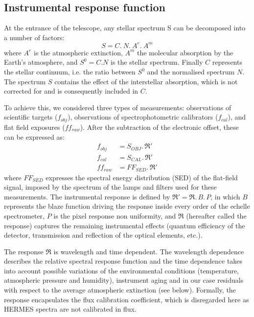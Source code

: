 \subsection{Instrumental response function}
At the entrance of the telescope, any stellar spectrum S can be decomposed into a number of factors:
\begin{equation}
    S = C .\ N .\ A^e .\ A^m
\end{equation}
where $A^e$ is the atmospheric extinction, $A^m$ the molecular absorption by the Earth's atmosphere, and $S^0 = C . N$ is the stellar spectrum. Finally $C$ represents the stellar continuum, i.e. the ratio between $S^0$ and the normalised spectrum $N$. The spectrum $S$ contains the effect of the interstellar absorption, which is not corrected for and is consequently included in $C$.

To achieve this, we considered three types of measurements: observations of scientific targets ($f_{obj}$), observations of spectrophotometric calibrators ($f_{cal}$), and flat field exposures ($ff_{raw}$). After the subtraction of the electronic offset, these can be expressed as:
    \begin{align}
    \label{eq:obj}
    f_{obj} &= S_{OBJ} .\, \Re'\\
    \label{eq:cal}
    f_{cal} &= S_{CAL} .\, \Re'\\
    \label{eq:ff}
    ff_{raw} &= FF_{SED} .\, \Re'
    \end{align}
where $FF_{SED}$ expresses the spectral energy distribution (SED) of the flat-field signal, imposed by the spectrum of the lamps and filters used for these measurements. The instrumental response is defined by $\Re' = \Re .\, B .\, P$, in which $B$ represents the blaze function driving the response inside every order of the echelle spectrometer, $P$ is the pixel response non uniformity, and $\Re$ (hereafter called the response) captures the remaining instrumental effects (quantum efficiency of the detector, transmission and reflection of the optical elements, etc.).

The response $\Re$ is wavelength and time dependent. The wavelength dependence describes the relative spectral response function and the time dependence takes into account possible variations of the environmental conditions (temperature, atmospheric pressure and humidity), instrument aging and in our case residuals with respect to the average atmospheric extinction (see below). Formally, the response encapsulates the flux calibration coefficient, which is disregarded here as HERMES spectra are not calibrated in flux.

